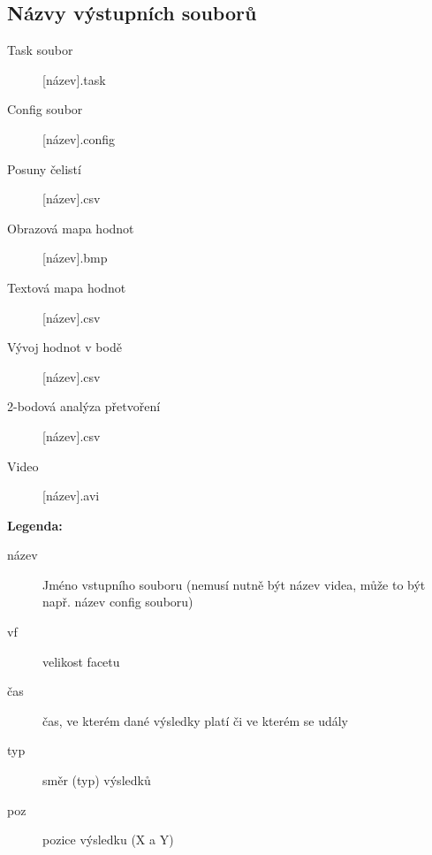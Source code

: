 \documentclass[a4paper,12pt]{article}
\begin{document}
\subsection{Názvy výstupních souborů}
\label{sec:names}
\begin{description}
\item [Task soubor] [název]\textunderscore [vf].task
\item [Config soubor] [název]\textunderscore [vf].config
\item [Posuny čelistí] [název]\textunderscore [vf].csv
\item[Obrazová mapa hodnot]  [název]\textunderscore [čas]\textunderscore [typ]\textunderscore [vf].bmp
\item[Textová mapa hodnot] [název]\textunderscore [čas]\textunderscore [typ]\textunderscore [vf].csv
\item[Vývoj hodnot v bodě] [název]\textunderscore [poz]\textunderscore [vf].csv
\item[2-bodová analýza přetvoření] [název]\textunderscore [poz-1]\textunderscore [poz-2\textunderscore [vf].csv
\item[Video] [název]\textunderscore [typ].avi
\end{description}
\begin{center}\textbf{Legenda:}\end{center}
\begin{description}
\item[název] Jméno vstupního souboru (nemusí nutně být název videa, může to být např. název config souboru)
\item[vf] velikost facetu
\item[čas] čas, ve kterém dané výsledky platí či ve kterém se udály  
\item[typ] směr (typ) výsledků 
\item[poz] pozice výsledku (X a Y)
\end{description}
\newpage
\end{document}
